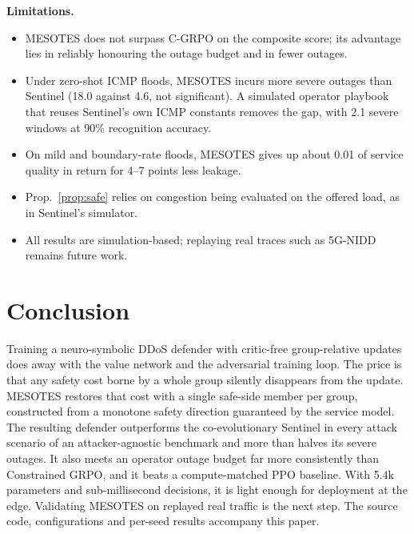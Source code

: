\documentclass[conference]{IEEEtran}
\begin{document}
\textbf{Limitations.}
\begin{itemize}
\item MESOTES does not surpass C-GRPO on the composite score; its advantage lies in reliably honouring the outage budget and in fewer outages.
\item Under zero-shot ICMP floods, MESOTES incurs more severe outages than Sentinel (18.0 against 4.6, not significant). A simulated operator playbook that reuses Sentinel's own ICMP constants removes the gap, with 2.1 severe windows at 90\% recognition accuracy.
\item On mild and boundary-rate floods, MESOTES gives up about 0.01 of service quality in return for 4--7 points less leakage.
\item Prop.~\ref{prop:safe} relies on congestion being evaluated on the offered load, as in Sentinel's simulator.
\item All results are simulation-based; replaying real traces such as 5G-NIDD remains future work.
\end{itemize}

\section{Conclusion}
Training a neuro-symbolic DDoS defender with critic-free group-relative updates does away with the value network and the adversarial training loop. The price is that any safety cost borne by a whole group silently disappears from the update. MESOTES restores that cost with a single safe-side member per group, constructed from a monotone safety direction guaranteed by the service model. The resulting defender outperforms the co-evolutionary Sentinel in every attack scenario of an attacker-agnostic benchmark and more than halves its severe outages. It also meets an operator outage budget far more consistently than Constrained GRPO, and it beats a compute-matched PPO baseline. With 5.4k parameters and sub-millisecond decisions, it is light enough for deployment at the edge. Validating MESOTES on replayed real traffic is the next step. The source code, configurations and per-seed results accompany this paper.



\end{document}
